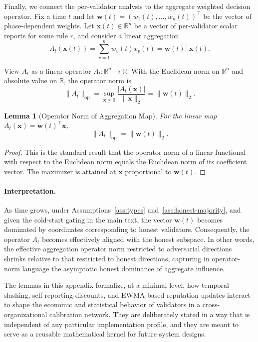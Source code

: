 \documentclass[11pt]{article}
\theoremstyle{plain}
\newtheorem{lemma}{Lemma}
\theoremstyle{definition}
\begin{document}
Finally, we connect the per-validator analysis to the aggregate weighted decision operator. Fix a time \(t\) and let \(\bm{w}(t) = (w_1(t),\dots,w_n(t))^\top\) be the vector of phase-dependent weights. Let \(\bm{x}(t) \in \mathbb{R}^n\) be a vector of per-validator scalar reports for some rule \(r\), and consider a linear aggregation
\[
A_t(\bm{x}(t)) = \sum_{v=1}^n w_v(t)x_v(t) = \bm{w}(t)^\top \bm{x}(t).
\]

View \(A_t\) as a linear operator \(A_t:\mathbb{R}^n \to \mathbb{R}\). With the Euclidean norm on \(\mathbb{R}^n\) and absolute value on \(\mathbb{R}\), the operator norm is
\[
\|A_t\|_{\mathrm{op}} = \sup_{\bm{x} \neq 0} \frac{|A_t(\bm{x})|}{\|\bm{x}\|_2} = \|\bm{w}(t)\|_2.
\]

\begin{lemma}[Operator Norm of Aggregation Map]
\label{lem:aggregation-op}
For the linear map \(A_t(\bm{x}) = \bm{w}(t)^\top \bm{x}\),
\[
\|A_t\|_{\mathrm{op}} = \|\bm{w}(t)\|_2.
\]
\end{lemma}

\begin{proof}
This is the standard result that the operator norm of a linear functional with respect to the Euclidean norm equals the Euclidean norm of its coefficient vector. The maximizer is attained at \(\bm{x}\) proportional to \(\bm{w}(t)\).
\end{proof}

\paragraph{Interpretation.}
As time grows, under Assumptions~\ref{ass:types} and~\ref{ass:honest-majority}, and given the cold-start gating in the main text, the vector \(\bm{w}(t)\) becomes dominated by coordinates corresponding to honest validators. Consequently, the operator \(A_t\) becomes effectively aligned with the honest subspace. In other words, the effective aggregation operator norm restricted to adversarial directions shrinks relative to that restricted to honest directions, capturing in operator-norm language the asymptotic honest dominance of aggregate influence.

\bigskip

The lemmas in this appendix formalize, at a minimal level, how temporal slashing, self-reporting discounts, and EWMA-based reputation updates interact to shape the economic and statistical behavior of validators in a cross-organizational calibration network. They are deliberately stated in a way that is independent of any particular implementation profile, and they are meant to serve as a reusable mathematical kernel for future system designs.

\nocite{*}
  

\end{document}
